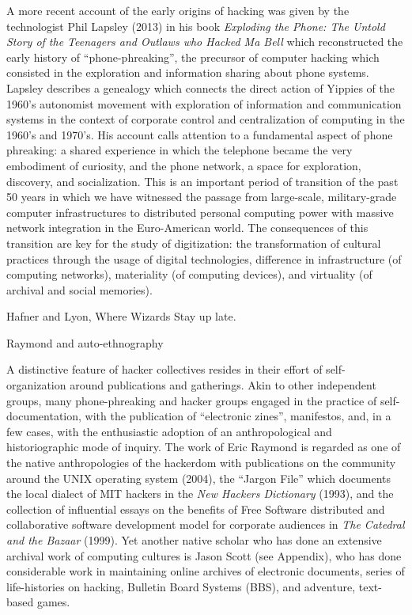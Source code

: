 \documentclass[10pt,letter,oneside]{scrartcl}
\begin{document}
A more recent account of the early origins of hacking was given by the
technologist Phil Lapsley (2013) in his book \emph{Exploding the Phone: The
Untold Story of the Teenagers and Outlaws who Hacked Ma Bell} which
reconstructed the early history of ``phone-phreaking'', the precursor of
computer hacking which consisted in the exploration and information sharing
about phone systems.  Lapsley describes a genealogy which connects the direct
action of Yippies of the 1960's autonomist movement with exploration of
information and communication systems in the context of corporate control and
centralization of computing in the 1960's and 1970's.  His account calls
attention to a fundamental aspect of phone phreaking: a shared experience in
which the telephone became the very embodiment of curiosity, and the phone
network, a space for exploration, discovery, and socialization.  This is an
important period of transition of the past 50 years in which we have witnessed
the passage from large-scale, military-grade computer infrastructures to
distributed personal computing power with massive network integration in the
Euro-American world. The consequences of this transition are key for the study
of digitization: the transformation of cultural practices through the usage of
digital technologies, difference in infrastructure (of computing networks),
materiality (of computing devices), and virtuality (of archival and social
memories).

Hafner and Lyon, Where Wizards Stay up late. 

Raymond and auto-ethnography

A distinctive feature of hacker collectives resides in their effort of
self-organization around publications and gatherings.  Akin to other
independent groups, many phone-phreaking and hacker groups engaged in the
practice of self-documentation, with the publication of ``electronic zines'',
manifestos, and, in a few cases, with the enthusiastic adoption of an
anthropological and historiographic mode of inquiry.  The work of Eric Raymond
is regarded as one of the native anthropologies of the hackerdom with
publications on the community around the UNIX operating system (2004), the
``Jargon File'' which documents the local dialect of MIT hackers in the
\emph{New Hackers Dictionary} (1993), and the collection of influential essays
on the benefits of Free Software distributed and collaborative software
development model for corporate audiences in \emph{The Catedral and the Bazaar}
(1999).  Yet another native scholar who has done an extensive archival work of
computing cultures is Jason Scott (see Appendix), who has done considerable
work in maintaining online archives of electronic documents, series of
life-histories on hacking, Bulletin Board Systems (BBS), and adventure,
text-based games.
\end{document}
